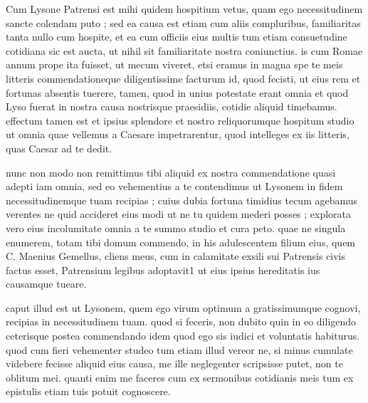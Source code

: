 


 Cum Lysone Patrensi est mihi quidem hospitium vetus, quam ego necessitudinem sancte colendam puto ; sed ea causa est etiam cum aliis compluribus, familiaritas tanta nullo cum hospite, et ea cum officiis eius multis tum etiam consuetudine cotidiana sic est aucta, ut nihil sit familiaritate nostra coniunctius. is cum Romae annum prope ita fuisset, ut mecum viveret, etsi eramus in magna spe te meis litteris commendationeque diligentissime facturum id, quod fecisti, ut eius rem et fortunas absentis tuerere, tamen, quod in unius potestate erant omnia et quod Lyso fuerat in nostra causa nostrisque praesidiis, cotidie aliquid timebamus. effectum tamen est et ipsius splendore et nostro reliquorumque hospitum studio ut omnia quae vellemus a Caesare impetrarentur, quod intelleges ex iis litteris, quas Caesar ad te dedit.

 nunc non modo non remittimus tibi aliquid ex nostra commendatione quasi adepti iam omnia, sed eo vehementius a te contendimus ut Lysonem in fidem necessitudinemque tuam recipias ; cuius dubia fortuna timidius tecum agebamus verentes ne quid accideret eius modi ut ne tu quidem mederi posses ; explorata vero eius incolumitate omnia a te summo studio et cura peto. quae ne singula enumerem, totam tibi domum commendo, in his adulescentem filium eius, quem C. Maenius Gemellus, cliens meus, cum in calamitate exsili sui Patrensis civis factus esset, Patrensium legibus adoptavit1 ut eius ipsius hereditatis ius causamque tueare.

 caput illud est ut Lysonem, quem ego virum optimum a gratissimumque cognovi, recipias in necessitudinem tuam. quod si feceris, non dubito quin in eo diligendo ceterisque postea commendando idem quod ego sis iudici et voluntatis habiturus. quod cum fieri vehementer studeo tum etiam illud vereor ne, si minus cumulate videbere fecisse aliquid eius causa, me ille neglegenter scripsisse putet, non te oblitum mei. quanti enim me faceres cum ex sermonibus cotidianis meis tum ex epistulis etiam tuis potuit cognoscere.
